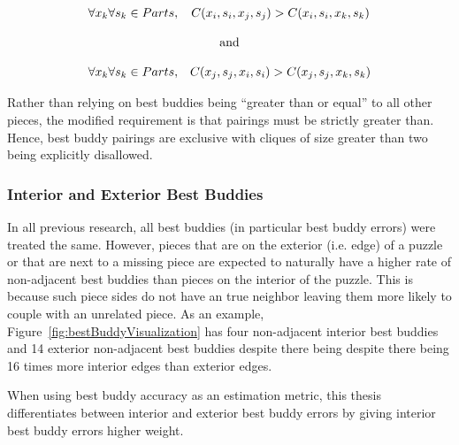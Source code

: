 \documentclass{report}
\begin{document}
\begin{equation} \label{eq:hammoudehBestBuddyDefinition}
\begin{split}
\begin{matrix}
\forall{x_k} \forall{s_k} \in Parts, & C(x_i, s_i, x_j, s_j) > C(x_i, s_i, x_k, s_k)
\\
\\
\multicolumn{2}{c}{\textnormal{and}}
\\
\\
\forall{x_k} \forall{s_k} \in Parts, & C(x_j, s_j, x_i, s_i) > C(x_j, s_j, x_k, s_k)
\end{matrix}
\end{split}
\end{equation}

Rather than relying on best buddies being ``greater than or equal'' to all other pieces, the modified requirement is that pairings must be strictly greater than.  Hence, best buddy pairings are exclusive with cliques of size greater than two being explicitly disallowed.

\subsubsection{Interior and Exterior Best Buddies}\label{sec:interiorExteriorBestBuddies}

In all previous research, all best buddies (in particular best buddy errors) were treated the same.  However, pieces that are on the exterior (i.e. edge) of a puzzle or that are next to a missing piece are expected to naturally have a higher rate of non-adjacent best buddies than pieces on the interior of the puzzle.  This is because such piece sides do not have an true neighbor leaving them more likely to couple with an unrelated piece.  As an example, Figure~\ref{fig:bestBuddyVisualization} has four non-adjacent interior best buddies and 14 exterior non-adjacent best buddies despite there being despite there being 16 times more interior edges than exterior edges. 

When using best buddy accuracy as an estimation metric, this thesis differentiates between interior and exterior best buddy errors by giving interior best buddy errors higher weight.






\end{document}
